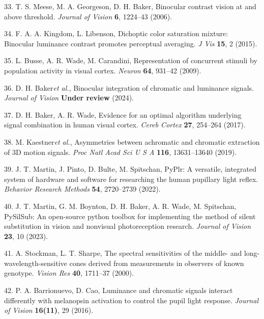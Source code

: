 \documentclass[
]{article}
\begin{document}
\leavevmode\hypertarget{ref-Meese2006}{}%
33. T. S. Meese, M. A. Georgeson, D. H. Baker, Binocular contrast vision at and above threshold. \emph{Journal of Vision} \textbf{6}, 1224--43 (2006).

\leavevmode\hypertarget{ref-Kingdom2015}{}%
34. F. A. A. Kingdom, L. Libenson, Dichoptic color saturation mixture: Binocular luminance contrast promotes perceptual averaging. \emph{J Vis} \textbf{15}, 2 (2015).

\leavevmode\hypertarget{ref-Busse2009}{}%
35. L. Busse, A. R. Wade, M. Carandini, Representation of concurrent stimuli by population activity in visual cortex. \emph{Neuron} \textbf{64}, 931--42 (2009).

\leavevmode\hypertarget{ref-Baker2024}{}%
36. D. H. Baker\emph{et al.}, Binocular integration of chromatic and luminance signals. \emph{Journal of Vision} \textbf{Under review} (2024).

\leavevmode\hypertarget{ref-Baker2017}{}%
37. D. H. Baker, A. R. Wade, Evidence for an optimal algorithm underlying signal combination in human visual cortex. \emph{Cereb Cortex} \textbf{27}, 254--264 (2017).

\leavevmode\hypertarget{ref-Kaestner2019}{}%
38. M. Kaestner\emph{et al.}, Asymmetries between achromatic and chromatic extraction of 3D motion signals. \emph{Proc Natl Acad Sci U S A} \textbf{116}, 13631--13640 (2019).

\leavevmode\hypertarget{ref-Martin2022}{}%
39. J. T. Martin, J. Pinto, D. Bulte, M. Spitschan, PyPlr: A versatile, integrated system of hardware and software for researching the human pupillary light reflex. \emph{Behavior Research Methods} \textbf{54}, 2720--2739 (2022).

\leavevmode\hypertarget{ref-Martin2023}{}%
40. J. T. Martin, G. M. Boynton, D. H. Baker, A. R. Wade, M. Spitschan, PySilSub: An open-source python toolbox for implementing the method of silent substitution in vision and nonvisual photoreception research. \emph{Journal of Vision} \textbf{23}, 10 (2023).

\leavevmode\hypertarget{ref-Stockman2000}{}%
41. A. Stockman, L. T. Sharpe, The spectral sensitivities of the middle- and long-wavelength-sensitive cones derived from measurements in observers of known genotype. \emph{Vision Res} \textbf{40}, 1711--37 (2000).

\leavevmode\hypertarget{ref-Barrionuevo2016}{}%
42. P. A. Barrionuevo, D. Cao, Luminance and chromatic signals interact differently with melanopsin activation to control the pupil light response. \emph{Journal of Vision} \textbf{16(11)}, 29 (2016).
\end{document}

